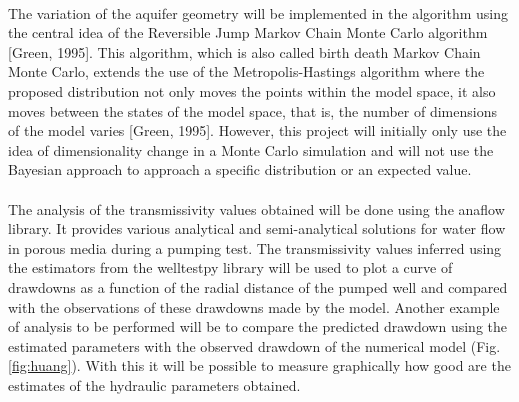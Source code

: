\documentclass[11pt, a4paper]{article}
\begin{document}
    \paragraph{} %
    The variation of the aquifer geometry will be implemented in the algorithm using the central idea of the Reversible Jump Markov Chain Monte Carlo algorithm [Green, 1995]. This algorithm, which is also called birth death Markov Chain Monte Carlo, extends the use of the Metropolis-Hastings algorithm where the proposed distribution not only moves the points within the model space, it also moves between the states of the model space, that is, the number of dimensions of the model varies [Green, 1995]. However, this project will initially only use the idea of dimensionality change in a Monte Carlo simulation and will not use the Bayesian approach to approach a specific distribution or an expected value.
    \paragraph{} %
    The analysis of the transmissivity values obtained will be done using the anaflow library. It provides various analytical and semi-analytical solutions for water flow in porous media during a pumping test. The transmissivity values inferred using the estimators from the welltestpy library will be used to plot a curve of drawdowns as a function of the radial distance of the pumped well and compared with the observations of these drawdowns made by the model. Another example of analysis to be performed will be to compare the predicted drawdown using the estimated parameters with the observed drawdown of the numerical model (Fig. \ref{fig:huang}). With this it will be possible to measure graphically how good are the estimates of the hydraulic parameters obtained.
    
\end{document}
